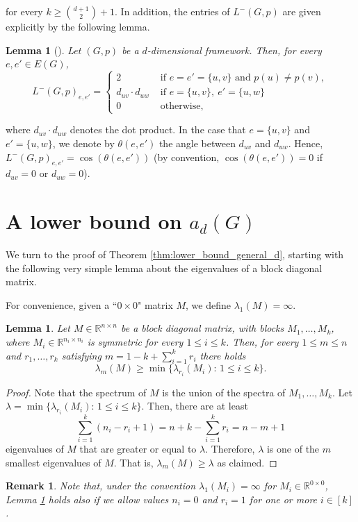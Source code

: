 \documentclass[a4paper,11pt]{article}
\theoremstyle{plain}
\newtheorem{remark}[theorem]{\bf Remark}
\newtheorem{lemma}[theorem]{\bf Lemma}
\theoremstyle{definition}
\newcommand{\Rea}{{\mathbb R}}
\begin{document}
for every $k\geq \binom{d+1}{2}+1$. In addition, the entries of $L^{-}(G,p)$ are given explicitly by the following lemma.
\begin{lemma}[{\cite[Lemma 2.1]{lew2022d}}]
\label{lemma:down_laplacian}
Let $(G,p)$ be a $d$-dimensional framework. Then, for every $e,e'\in E(G)$,
\[
    L^{-}(G,p)_{e,e'}= \begin{cases}
                    2 & \text{ if } e=e'=\{u,v\} \text{ and } p(u)\neq p(v),\\
  d_{uv}\cdot d_{uw} & \text{ if } e=\{u,v\},~e'=\{u,w\} \\
                    0 & \text{ otherwise,}
                    \end{cases} 
\]
\end{lemma}
where $d_{uv}\cdot d_{uw}$ denotes the dot product. In the case that $e=\{u,v\}$ and $e'=\{u,w\}$, we denote by
$\theta(e,e')$ the angle between $d_{uv}$ and $d_{uw}$. Hence,  
    $L^{-}(G,p)_{e,e'}=\cos(\theta(e,e'))$ (by convention, $\cos(\theta(e,e'))=0$ if $d_{uv}=0$ or $d_{uw}=0$).



\section{A lower bound on $a_d(G)$}\label{sec:lower_bound}


We turn to the proof of Theorem \ref{thm:lower_bound_general_d}, starting with the following very simple lemma about the eigenvalues of a block diagonal matrix.

For convenience, given a ``$0\times 0$" matrix $M$, we define $\lambda_1(M)=\infty$. 

\begin{lemma}\label{lemma:block_diagonal}
Let $M\in\Rea^{n\times n}$ be a block diagonal matrix, with blocks $M_1,\ldots,M_k$, where $M_i\in \Rea^{n_i\times n_i}$ is symmetric for every $1\leq i\leq k$. Then, for every $1\leq m\leq n$ and $r_1,\ldots, r_k$ satisfying $m=1-k+\sum_{i=1}^k r_i$ there holds
\[
\lambda_m(M)\geq \min \{ \lambda_{r_i}(M_i) : \, 1\leq i\leq k\}.
\]
\end{lemma}
\begin{proof}
Note that the spectrum of $M$ is the union of the spectra of $M_1,\ldots,M_k$. Let $\lambda=\min \{ \lambda_{r_i}(M_i) : \, 1\leq i\leq k\}$. Then, there are at least 
\[
 \sum_{i=1}^k (n_i-r_i+1)= n+k-\sum_{i=1}^k r_i= n-m+1
\]
eigenvalues of $M$ that are greater or equal to $\lambda$. Therefore, $\lambda$ is one of the $m$ smallest eigenvalues of $M$. That is, $\lambda_m(M)\geq \lambda$ as claimed.
\end{proof}
\begin{remark}
    Note that, under the convention $\lambda_1(M_i)=\infty$ for $M_i\in \Rea^{0\times 0}$, Lemma \ref{lemma:block_diagonal} holds 
     also if we allow values $n_i=0$ and $r_i=1$ for one or more $i\in[k]$.
\end{remark}
\end{document}

